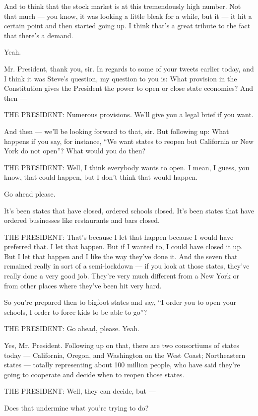 And to think that the stock market is at this tremendously high number.
Not that much --- you know, it was looking a little bleak for a while,
but it --- it hit a certain point and then started going up. I think
that's a great tribute to the fact that there's a demand.

Yeah.

Mr. President, thank you, sir. In regards to some of your tweets earlier
today, and I think it was Steve's question, my question to you is: What
provision in the Constitution gives the President the power to open or
close state economies? And then ---

THE PRESIDENT: Numerous provisions. We'll give you a legal brief if you
want.

And then --- we'll be looking forward to that, sir. But following up:
What happens if you say, for instance, ``We want states to reopen but
California or New York do not open''? What would you do then?

THE PRESIDENT: Well, I think everybody wants to open. I mean, I guess,
you know, that could happen, but I don't think that would happen.

Go ahead please.

It's been states that have closed, ordered schools closed. It's been
states that have ordered businesses like restaurants and bars closed.

THE PRESIDENT: That's because I let that happen because I would have
preferred that. I let that happen. But if I wanted to, I could have
closed it up. But I let that happen and I like the way they've done it.
And the seven that remained really in sort of a semi-lockdown --- if you
look at those states, they've really done a very good job. They're very
much different from a New York or from other places where they've been
hit very hard.

So you're prepared then to bigfoot states and say, ``I order you to open
your schools, I order to force kids to be able to go''?

THE PRESIDENT: Go ahead, please. Yeah.

Yes, Mr. President. Following up on that, there are two consortiums of
states today --- California, Oregon, and Washington on the West Coast;
Northeastern states --- totally representing about 100 million people,
who have said they're going to cooperate and decide when to reopen those
states.

THE PRESIDENT: Well, they can decide, but ---

Does that undermine what you're trying to do?

